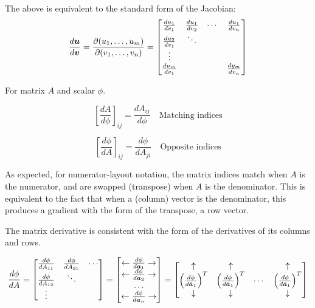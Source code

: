 \documentclass[../../main.tex]{subfiles}
\begin{document}
The above is equivalent to the standard form of the Jacobian:
\[ \frac{d\bm{u}}{d\bm{v}} = \frac{\partial(u_1, \ldots, u_m)}{\partial(v_1, \ldots, v_n)} =
\left[\begin{matrix}
    \frac{du_1}{dv_1} & \frac{du_1}{dv_2} & \cdots & \frac{du_1}{dv_n}\\
    \frac{du_2}{dv_1} & \ddots & & \\
    \vdots & &  & \\
    \frac{du_m}{dv_1} & & & \frac{dy_m}{dv_n}
\end{matrix}\right]
\]

For matrix $A$ and scalar $\phi$.

\[ {\left[\frac{dA}{d\phi}\right]}_{ij} = \frac{dA_{ij}}{d\phi}
\quad \textrm{Matching indices}\]

\[ {\left[\frac{d\phi}{dA}\right]}_{ij} = \frac{d\phi}{dA_{ji}}
\quad \textrm{Opposite indices}\]

As expected, for numerator-layout notation, the matrix indices match when $A$ is the numerator, and are swapped (transpose) when $A$ is the denominator.
This is equivalent to the fact that when a (column) vector is the denominator, this produces a gradient with the form of the transpose, a row vector.

The matrix derivative is consistent with the form of the derivatives of its columns and rows.

\[ \frac{d\phi}{dA} =
\left[\begin{matrix}
    \frac{d\phi}{dA_{11}} & \frac{d\phi}{dA_{21}} & \cdots \\
    \frac{d\phi}{dA_{12}} & \ddots & \\
    \vdots & &
\end{matrix}\right] =
\left[\begin{matrix}
        \leftarrow \frac{d\phi}{d\bm{a}_1} \rightarrow \\
        \leftarrow \frac{d\phi}{d\bm{a}_2} \rightarrow \\
        \dots \\
        \leftarrow \frac{d\phi}{d\bm{a}_n} \rightarrow \\
\end{matrix}\right] =
\left[\begin{matrix}
        \uparrow & \uparrow & & \uparrow \\
    {\left(\frac{d\phi}{d\hat{\bm{a}}_1}\right)}^T &
    {\left(\frac{d\phi}{d\hat{\bm{a}}_1}\right)}^T &
    \cdots &
    {\left(\frac{d\phi}{d\hat{\bm{a}}_1}\right)}^T \\
        \downarrow & \downarrow & & \downarrow
\end{matrix}\right]
\]
\end{document}
